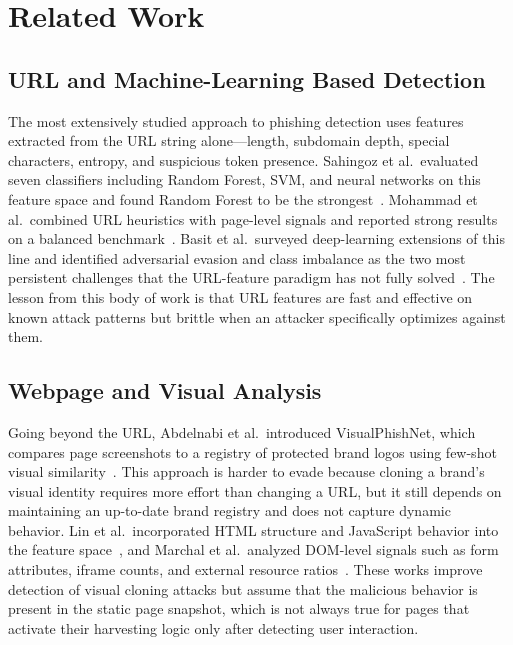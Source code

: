 \documentclass[conference]{IEEEtran}
\begin{document}
\section{Related Work}

\subsection{URL and Machine-Learning Based Detection}
The most extensively studied approach to phishing detection uses features extracted from the URL
string alone---length, subdomain depth, special characters, entropy, and suspicious token
presence.
Sahingoz et al.\ evaluated seven classifiers including Random Forest, SVM, and neural networks
on this feature space and found Random Forest to be the strongest~\cite{ref4}.
Mohammad et al.\ combined URL heuristics with page-level signals and reported strong results on
a balanced benchmark~\cite{ref5}.
Basit et al.\ surveyed deep-learning extensions of this line and identified adversarial evasion
and class imbalance as the two most persistent challenges that the URL-feature paradigm has not
fully solved~\cite{ref6}.
The lesson from this body of work is that URL features are fast and effective on known attack
patterns but brittle when an attacker specifically optimizes against them.

\subsection{Webpage and Visual Analysis}
Going beyond the URL, Abdelnabi et al.\ introduced VisualPhishNet, which compares page screenshots
to a registry of protected brand logos using few-shot visual similarity~\cite{ref7}.
This approach is harder to evade because cloning a brand's visual identity requires more effort
than changing a URL, but it still depends on maintaining an up-to-date brand registry and does
not capture dynamic behavior.
Lin et al.\ incorporated HTML structure and JavaScript behavior into the feature space~\cite{ref8},
and Marchal et al.\ analyzed DOM-level signals such as form attributes, iframe counts, and
external resource ratios~\cite{ref9}.
These works improve detection of visual cloning attacks but assume that the malicious behavior
is present in the static page snapshot, which is not always true for pages that activate their
harvesting logic only after detecting user interaction.
\end{document}
